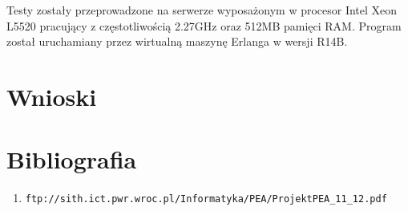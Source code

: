   Testy zostały przeprowadzone na serwerze wyposażonym w procesor Intel Xeon
  L5520 pracujący z częstotliwością 2.27GHz oraz 512MB pamięci RAM. Program
  został uruchamiany przez wirtualną maszynę Erlanga w wersji R14B.


\section{Wnioski} %
  \label{sec:wnioski}



\appendix
\section{Bibliografia} %
  \label{sec:biblio}
  \begin{enumerate}
    \item \texttt{ftp://sith.ict.pwr.wroc.pl/Informatyka/PEA/ProjektPEA\_11\_12.pdf}
  \end{enumerate}

